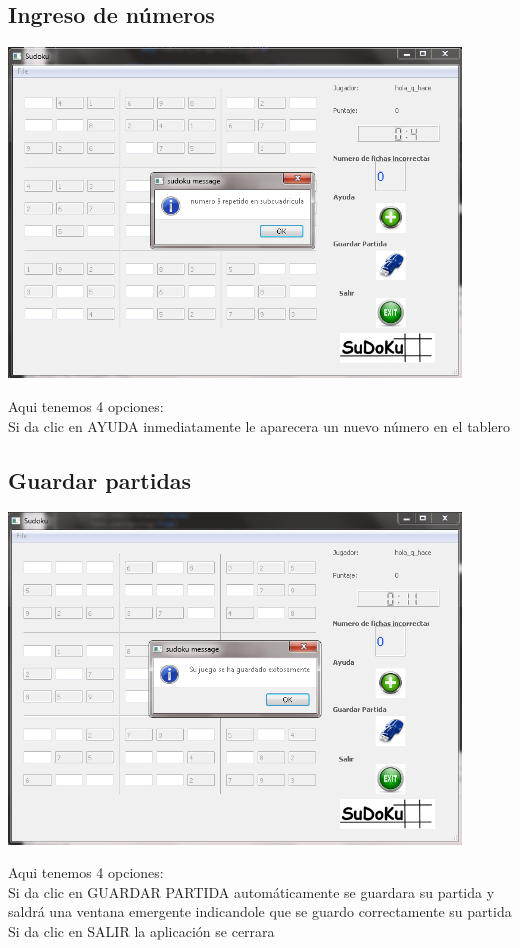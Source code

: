 \documentclass[12pt]{extbook}
\begin{document}
\begin{center}
\section{Ingreso de números}
\end{center}
\begin{center}
\includegraphics[width=12cm]{num_incorrecto.png}
\end{center}
Aqui tenemos 4 opciones:\\
Si da clic en AYUDA inmediatamente le aparecera un nuevo número en el tablero\\

\begin{center}
\section{Guardar partidas}
\end{center}
\begin{center}
\includegraphics[width=12cm]{partida_guardada.png}
\end{center}
Aqui tenemos 4 opciones:\\
Si da clic en GUARDAR PARTIDA automáticamente se guardara su partida y saldrá una ventana emergente indicandole que se guardo correctamente su partida\\
Si da clic en SALIR la aplicación se cerrara \\
\end{document}
